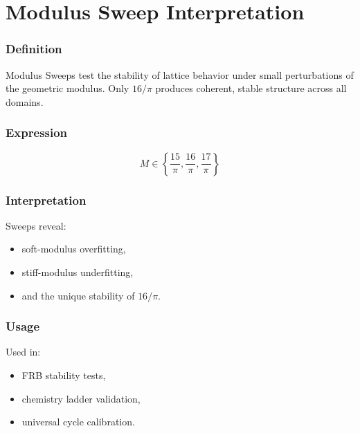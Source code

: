 \documentclass[12pt,oneside]{book}
\begin{document}

\section{Modulus Sweep Interpretation}

\subsubsection{Definition}
Modulus Sweeps test the stability of lattice behavior under small perturbations of the geometric
modulus. Only $16/\pi$ produces coherent, stable structure across all domains.

\subsubsection{Expression}


\[
M \in \left\{ \frac{15}{\pi}, \frac{16}{\pi}, \frac{17}{\pi} \right\}
\]



\subsubsection{Interpretation}
Sweeps reveal:
\begin{itemize}
    \item soft-modulus overfitting,
    \item stiff-modulus underfitting,
    \item and the unique stability of $16/\pi$.
\end{itemize}

\subsubsection{Usage}
Used in:
\begin{itemize}
    \item FRB stability tests,
    \item chemistry ladder validation,
    \item universal cycle calibration.
\end{itemize}

\end{document}
